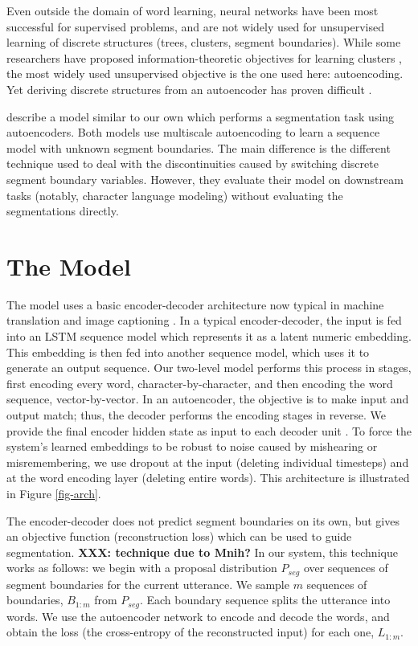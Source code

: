 \documentclass[11pt,letterpaper]{article}
\newcommand{\xxx}[1]{\textbf{\color{red}XXX: #1}}
\begin{document}
Even outside the domain of word learning, neural networks have been
most successful for supervised problems, and are not widely used for
unsupervised learning of discrete structures (trees, clusters, segment
boundaries). While some researchers have proposed
information-theoretic objectives for learning clusters \cite{xxx}, the
most widely used unsupervised objective is the one used here:
autoencoding. Yet deriving discrete structures from an autoencoder has
proven difficult \cite{has-anyone-done-it}.

 describe a model similar to our own which performs a
segmentation task using autoencoders. Both models use multiscale
autoencoding to learn a sequence model with unknown segment
boundaries. The main difference is the different technique used to
deal with the discontinuities caused by switching discrete segment
boundary variables. However, they evaluate their model on downstream
tasks (notably, character language modeling) without evaluating the
segmentations directly.

\section{The Model}

The model uses a basic encoder-decoder architecture now typical in
machine translation \cite{xxx} and image captioning \cite{xxx}. In a
typical encoder-decoder, the input is fed into an LSTM sequence model
\cite{Schmidhuber} which represents it as a latent numeric
embedding. This embedding is then fed into another sequence model,
which uses it to generate an output sequence. Our two-level model
performs this process in stages, first encoding every word,
character-by-character, and then encoding the word sequence,
vector-by-vector. In an autoencoder, the objective is to make input
and output match; thus, the decoder performs the encoding stages in
reverse. We provide the final encoder hidden state as input to each
decoder unit \cite{xxx}. To force the system's learned embeddings to
be robust to noise caused by mishearing or misremembering, we use
dropout \cite{xxx} at the input (deleting individual timesteps) and at
the word encoding layer (deleting entire words). This architecture is
illustrated in Figure \ref{fig-arch}.

The encoder-decoder does not predict segment boundaries on its own,
but gives an objective function (reconstruction loss) which can be
used to guide segmentation. \xxx{technique due to Mnih?} In our
system, this technique works as follows: we begin with a proposal
distribution $P_{seg}$ over sequences of segment boundaries for the
current utterance. We sample $m$ sequences of boundaries, $B_{1:m}$
from $P_{seg}$. Each boundary sequence splits the utterance into
words. We use the autoencoder network to encode and decode the words,
and obtain the loss (the cross-entropy of the reconstructed input) for
each one, $L_{1:m}$.
\end{document}
